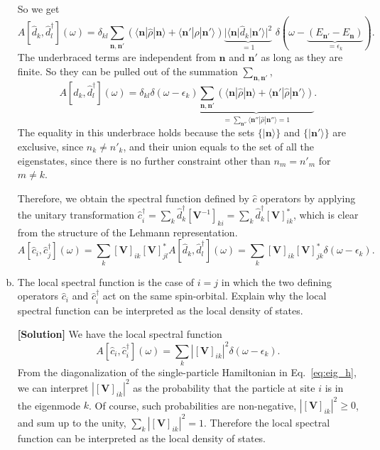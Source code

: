 \documentclass[11pt,a4paper,oneside]{article}
\begin{document}
\begin{enumerate}[(a)]
So we get
\begin{equation}
A[\hat{d}_k, \hat{d}_l^\dagger] (\omega) = 
\delta_{kl}
\sum_{\boldsymbol{n}, \boldsymbol{n}'}
(\langle \boldsymbol{n} | \hat{\rho} | \boldsymbol{n} \rangle + \langle \boldsymbol{n}' | \hat{\rho} | \boldsymbol{n}' \rangle)
\underbrace{| \langle\boldsymbol{n} | \hat{d}_k | \boldsymbol{n}' \rangle |^2}_{= 1}
\,
\, \delta (\omega - \underbrace{(E_{\boldsymbol{n}'} - E_{\boldsymbol{n}})}_{= \epsilon_k}) .
\end{equation}
The underbraced terms are independent from $\boldsymbol{n}$ and $\boldsymbol{n}'$ as long as they are finite.
So they can be pulled out of the summation $\sum_{\boldsymbol{n}, \boldsymbol{n}'}$,
\begin{equation}
A[\hat{d}_k, \hat{d}_l^\dagger] (\omega) = 
\delta_{kl}
\delta (\omega - \epsilon_k)
\underbrace{\sum_{\boldsymbol{n}, \boldsymbol{n}'}
(\langle \boldsymbol{n} | \hat{\rho} | \boldsymbol{n} \rangle + \langle \boldsymbol{n}' | \hat{\rho} | \boldsymbol{n}' \rangle)}_{= \sum_{\boldsymbol{n}''} \langle \boldsymbol{n}'' | \hat{\rho} | \boldsymbol{n}'' \rangle = 1} .
\end{equation}
The equality in this underbrace holds because the sets $\{ | \boldsymbol{n} \rangle \}$ and $\{ | \boldsymbol{n}' \rangle \}$ are exclusive, since $n_k \neq n'_k$, and their union equals to the set of all the eigenstates, since there is no further constraint other than $n_m = n'_m$ for $m \neq k$.

Therefore, we obtain the spectral function defined by $\hat{c}$ operators by applying the unitary transformation $\hat{c}_i^\dagger = \sum_{k} \hat{d}_k^\dagger [\boldsymbol{V}^{-1}]_{ki} =  \sum_{k} \hat{d}_k^\dagger [\boldsymbol{V}]_{ik}^*$,
which is clear from the structure of the Lehmann representation.
\begin{equation}
A[\hat{c}_i, \hat{c}_j^\dagger] (\omega) = \sum_k [\boldsymbol{V}]_{ik} [\boldsymbol{V}]_{jl}^* 
A[\hat{d}_k, \hat{d}_l^\dagger] (\omega)
= \sum_k [\boldsymbol{V}]_{ik} [\boldsymbol{V}]_{jk}^* 
\delta(\omega - \epsilon_k).
\end{equation}


\item
The local spectral function is the case of $i = j$ in which the two defining operators $\hat{c}_i$ and $\hat{c}_i^\dagger$ act on the same spin-orbital.
Explain why the local spectral function can be interpreted as the local density of states.

\textbf{[Solution]}
We have the local spectral function
\begin{equation}
A[\hat{c}_i, \hat{c}_i^\dagger] (\omega)
= \sum_k | [\boldsymbol{V}]_{ik} |^2
\delta(\omega - \epsilon_k).
\end{equation}
From the diagonalization of the single-particle Hamiltonian in Eq.~\eqref{eq:eig_h}, we can interpret $| [\boldsymbol{V}]_{ik} |^2$ as the probability that the particle at site $i$ is in the eigenmode $k$.
Of course, such probabilities are non-negative, $| [\boldsymbol{V}]_{ik} |^2 \geq 0$, and sum up to the unity, $\sum_k | [\boldsymbol{V}]_{ik} |^2 = 1$.
Therefore the local spectral function can be interpreted as the local density of states.

\end{enumerate}
\end{document}
